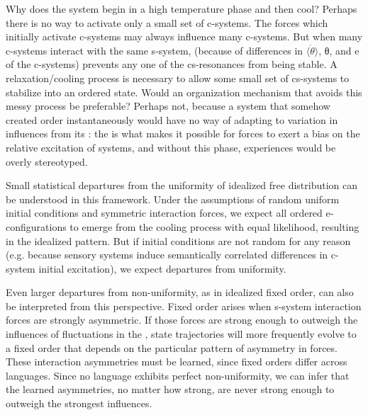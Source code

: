   Why does the system begin in a high temperature phase and then cool? Perhaps there is no way to activate only a small set of c-systems. The  forces which initially activate c-systems may always influence many c-systems. But when many c-systems interact with the same s-system,  (because of differences in $\langle\dot{\theta}\rangle$, θ, and e of the c-systems) prevents any one of the cs-resonances from being stable. A relaxation/cooling process is necessary to allow some small set of cs-systems to stabilize into an ordered state. Would an organization mechanism that avoids this messy process be preferable? Perhaps not, because a system that somehow created order instantaneously would have no way of adapting to variation in influences from its : the  is what makes it possible for  forces to exert a bias on the relative excitation of systems, and without this phase,  experiences would be overly stereotyped.

Small statistical departures from the uniformity of idealized free  distribution can be understood in this framework. Under the assumptions of random uniform initial conditions and symmetric interaction forces, we expect all ordered e-configurations to emerge from the cooling process with equal likelihood, resulting in the idealized  pattern. But if initial conditions are not random for any reason (e.g. because sensory systems induce semantically correlated differences in c-system initial excitation), we expect departures from uniformity.

  Even larger departures from non-uniformity, as in idealized fixed order, can also be interpreted from this perspective. Fixed order arises when s-system interaction forces are strongly asymmetric. If those forces are strong enough to outweigh the influences of fluctuations in the , state trajectories will more frequently evolve to a fixed order that depends on the particular pattern of asymmetry in  forces. These interaction asymmetries must be learned, since fixed orders differ across languages. Since no language exhibits perfect non-uniformity, we can infer that the learned asymmetries, no matter how strong, are never strong enough to outweigh the strongest  influences.

